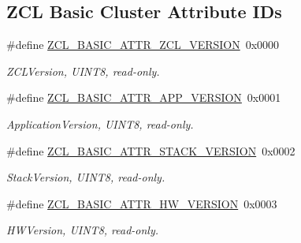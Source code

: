 \subsection*{Z\+CL Basic Cluster Attribute I\+Ds}
\begin{DoxyCompactItemize}
\item 
\mbox{\label{group__zcl__basic_ga3680b891bc5b62eeb20ad9d65502e2ee}} 
\#define \hyperlink{group__zcl__basic_ga3680b891bc5b62eeb20ad9d65502e2ee}{Z\+C\+L\+\_\+\+B\+A\+S\+I\+C\+\_\+\+A\+T\+T\+R\+\_\+\+Z\+C\+L\+\_\+\+V\+E\+R\+S\+I\+ON}~0x0000
\begin{DoxyCompactList}\small\item\em Z\+C\+L\+Version, U\+I\+N\+T8, read-\/only. \end{DoxyCompactList}\item 
\mbox{\label{group__zcl__basic_gab278ad4794718034db8bd583ed019fe7}} 
\#define \hyperlink{group__zcl__basic_gab278ad4794718034db8bd583ed019fe7}{Z\+C\+L\+\_\+\+B\+A\+S\+I\+C\+\_\+\+A\+T\+T\+R\+\_\+\+A\+P\+P\+\_\+\+V\+E\+R\+S\+I\+ON}~0x0001
\begin{DoxyCompactList}\small\item\em Application\+Version, U\+I\+N\+T8, read-\/only. \end{DoxyCompactList}\item 
\mbox{\label{group__zcl__basic_ga88bf0168f55c3addbe3c2ba54c8095b1}} 
\#define \hyperlink{group__zcl__basic_ga88bf0168f55c3addbe3c2ba54c8095b1}{Z\+C\+L\+\_\+\+B\+A\+S\+I\+C\+\_\+\+A\+T\+T\+R\+\_\+\+S\+T\+A\+C\+K\+\_\+\+V\+E\+R\+S\+I\+ON}~0x0002
\begin{DoxyCompactList}\small\item\em Stack\+Version, U\+I\+N\+T8, read-\/only. \end{DoxyCompactList}\item 
\mbox{\label{group__zcl__basic_gab2ab6140eb1374b9a82a56342a0b0fff}} 
\#define \hyperlink{group__zcl__basic_gab2ab6140eb1374b9a82a56342a0b0fff}{Z\+C\+L\+\_\+\+B\+A\+S\+I\+C\+\_\+\+A\+T\+T\+R\+\_\+\+H\+W\+\_\+\+V\+E\+R\+S\+I\+ON}~0x0003
\begin{DoxyCompactList}\small\item\em H\+W\+Version, U\+I\+N\+T8, read-\/only. \end{DoxyCompactList}\item 

\end{DoxyCompactItemize}
